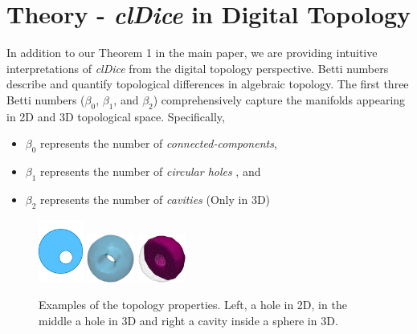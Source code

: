 \section{Theory - \textit{clDice} in Digital Topology}
\label{sec:interp}


In addition to our Theorem 1 in the main paper, %
we are providing intuitive interpretations of \textit{clDice} from the digital topology perspective. Betti numbers describe and quantify topological differences in algebraic topology. The first three Betti numbers ($\beta_0$, $\beta_1$, and $\beta_2$) comprehensively capture the manifolds appearing in 2D and 3D topological space. Specifically,
\begin{itemize}[itemsep=-4pt]%
    \item $\beta_0$ represents the number of \textit{connected-components},
    \item $\beta_1$ represents the number of \textit{circular holes}%
    , and
    \item $\beta_2$ represents the number of \textit{cavities} %
    (Only in 3D)
\end{itemize}{}


\begin{figure}[ht!]
\begin{center}
\includegraphics[width=0.13\textwidth]{figs/hole_2d.pdf}
\includegraphics[width=0.14\textwidth]{figs/hole.png}
\includegraphics[width=0.14\textwidth]{figs/cavity.png} \\
\end{center}
\caption{Examples of the topology properties. Left, a hole in 2D, in the middle a hole in 3D and right a cavity inside a sphere in 3D.} 
\label{fig_top_ex}
\end{figure}


